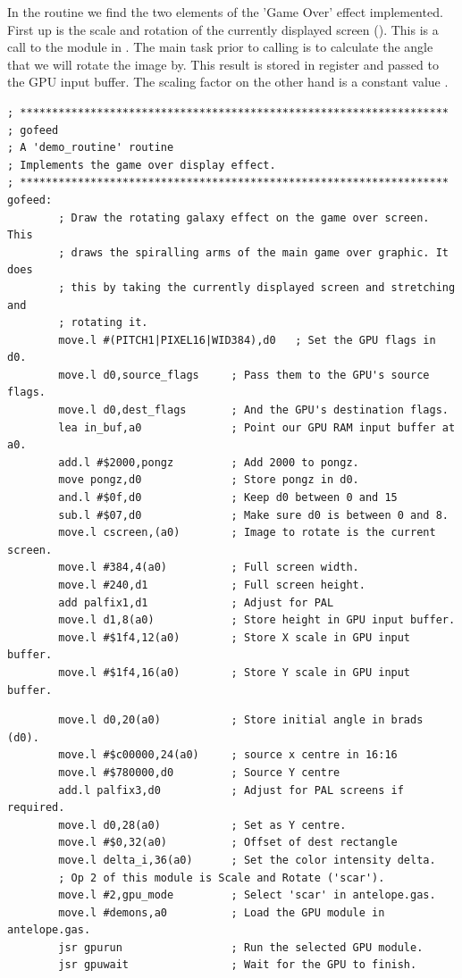 In the  routine we find the two elements of the 'Game Over' effect
implemented. First up is the scale and rotation of the currently displayed screen ().
This is a call to the  module in . The main task prior
to calling  is to calculate the angle that we will rotate the image by. This result
is stored in register  and passed to the GPU input buffer. The scaling factor on
the other hand is a constant value .

\begin{lstlisting}
; *******************************************************************
; gofeed
; A 'demo_routine' routine
; Implements the game over display effect.
; *******************************************************************
gofeed:
        ; Draw the rotating galaxy effect on the game over screen. This
        ; draws the spiralling arms of the main game over graphic. It does
        ; this by taking the currently displayed screen and stretching and
        ; rotating it.
        move.l #(PITCH1|PIXEL16|WID384),d0   ; Set the GPU flags in d0.
        move.l d0,source_flags     ; Pass them to the GPU's source flags.
        move.l d0,dest_flags       ; And the GPU's destination flags.
        lea in_buf,a0              ; Point our GPU RAM input buffer at a0.
        add.l #$2000,pongz         ; Add 2000 to pongz.
        move pongz,d0              ; Store pongz in d0.
        and.l #$0f,d0              ; Keep d0 between 0 and 15
        sub.l #$07,d0              ; Make sure d0 is between 0 and 8.
        move.l cscreen,(a0)        ; Image to rotate is the current screen.
        move.l #384,4(a0)          ; Full screen width.
        move.l #240,d1             ; Full screen height.
        add palfix1,d1             ; Adjust for PAL
        move.l d1,8(a0)            ; Store height in GPU input buffer.
        move.l #$1f4,12(a0)        ; Store X scale in GPU input buffer.
        move.l #$1f4,16(a0)        ; Store Y scale in GPU input buffer.
\end{lstlisting}
\begin{lstlisting}
        move.l d0,20(a0)           ; Store initial angle in brads (d0).
        move.l #$c00000,24(a0)     ; source x centre in 16:16
        move.l #$780000,d0         ; Source Y centre
        add.l palfix3,d0           ; Adjust for PAL screens if required.
        move.l d0,28(a0)           ; Set as Y centre.
        move.l #$0,32(a0)          ; Offset of dest rectangle
        move.l delta_i,36(a0)      ; Set the color intensity delta.
        ; Op 2 of this module is Scale and Rotate ('scar').
        move.l #2,gpu_mode         ; Select 'scar' in antelope.gas.
        move.l #demons,a0          ; Load the GPU module in antelope.gas.
        jsr gpurun                 ; Run the selected GPU module.
        jsr gpuwait                ; Wait for the GPU to finish.
\end{lstlisting}

